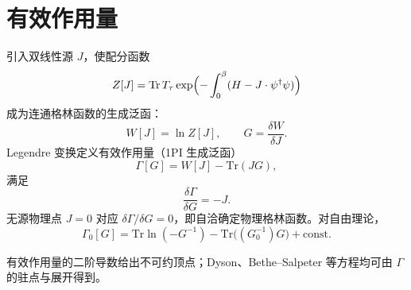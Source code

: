 \section{有效作用量}

引入双线性源 $J$，使配分函数
\begin{equation}
  Z[J]
  =\mathrm{Tr}\,
  T_\tau\exp\Bigl(
  -\int_0^\beta(H-J\cdot\psi^\dagger\psi)
  \Bigr)
\end{equation}
成为连通格林函数的生成泛函：
\begin{equation}
  W[J]=\ln Z[J],
  \qquad
  G=\frac{\delta W}{\delta J}.
\end{equation}
Legendre 变换定义有效作用量（1PI 生成泛函）
\begin{equation}
  \Gamma[G]
  =W[J]-\mathrm{Tr}(JG),
\end{equation}
满足
\begin{equation}
  \frac{\delta\Gamma}{\delta G}=-J.
\end{equation}
无源物理点 $J=0$ 对应 $\delta\Gamma/\delta G=0$，即自洽确定物理格林函数。对自由理论，
\begin{equation}
  \Gamma_0[G]
  =\mathrm{Tr}\ln(-G^{-1})-\mathrm{Tr}\bigl((G_0^{-1})G\bigr)+\mathrm{const}.
\end{equation}

\begin{note}
有效作用量的二阶导数给出不可约顶点；Dyson、Bethe--Salpeter 等方程均可由 $\Gamma$ 的驻点与展开得到。
\end{note}

